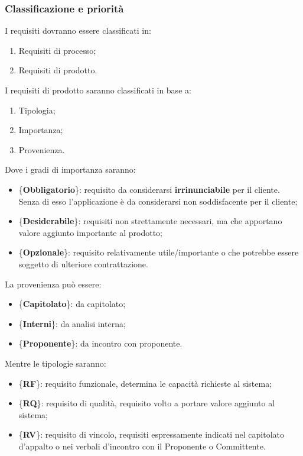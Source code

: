 {			\subsubsection{Classificazione e priorità}{
				I requisiti dovranno essere classificati in:
				\begin{enumerate}
					\item Requisiti\ped{g} di processo;
					\item Requisiti di prodotto.
				\end{enumerate}
				I requisiti di prodotto saranno classificati in base a:
				\begin{enumerate}
					\item Tipologia;
					\item Importanza;
					\item Provenienza.
				\end{enumerate}
				Dove i gradi di importanza saranno:
				\begin{itemize}
						\item \{\textbf{Obbligatorio}\}: requisito da considerarsi \textbf{irrinunciabile} per il cliente. Senza di esso l’applicazione è da considerarsi non soddisfacente per il cliente;
						\item \{\textbf{Desiderabile}\}: requisiti non strettamente necessari, ma che apportano valore aggiunto importante al prodotto;
						\item \{\textbf{Opzionale}\}: requisito relativamente utile/importante o che potrebbe essere soggetto di ulteriore contrattazione.
				\end{itemize}
				La provenienza può essere:
				\begin{itemize}
					\item \{\textbf{Capitolato}\}: da capitolato;
					\item \{\textbf{Interni}\}: da analisi interna;
					\item \{\textbf{Proponente}\}: da incontro con proponente.
				\end{itemize}
				Mentre le tipologie saranno:
				\begin{itemize}
					\item \{\textbf{RF}\}: requisito funzionale, determina le capacità richieste al sistema;
					\item \{\textbf{RQ}\}: requisito di qualità, requisito volto a portare valore aggiunto al sistema;
					\item \{\textbf{RV}\}: requisito di vincolo, requisiti espressamente indicati nel capitolato d’appalto o nei verbali d'incontro con il Proponente o Committente.
				\end{itemize}
			}
}
